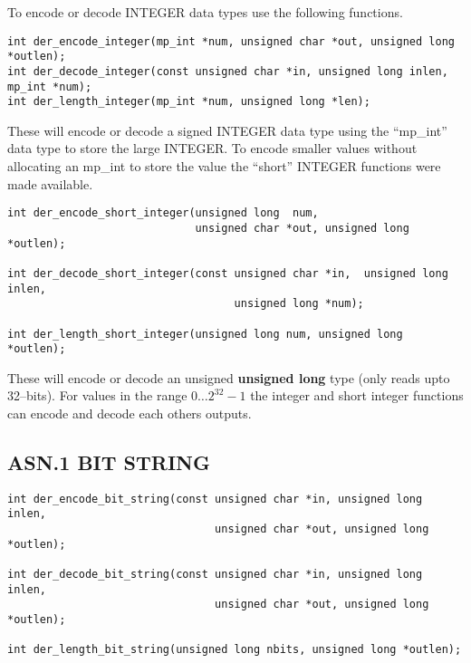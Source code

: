 \documentclass[a4paper]{book}
\begin{document}
To encode or decode INTEGER data types use the following functions.

\begin{verbatim}
int der_encode_integer(mp_int *num, unsigned char *out, unsigned long *outlen);
int der_decode_integer(const unsigned char *in, unsigned long inlen, mp_int *num);
int der_length_integer(mp_int *num, unsigned long *len);
\end{verbatim}

These will encode or decode a signed INTEGER data type using the ``mp\_int'' data type to store the large INTEGER.  To encode smaller values without allocating
an mp\_int to store the value the ``short'' INTEGER functions were made available.

\begin{verbatim}
int der_encode_short_integer(unsigned long  num, 
                             unsigned char *out, unsigned long *outlen);

int der_decode_short_integer(const unsigned char *in,  unsigned long inlen, 
                                   unsigned long *num);

int der_length_short_integer(unsigned long num, unsigned long *outlen);
\end{verbatim}

These will encode or decode an unsigned \textbf{unsigned long} type (only reads upto 32--bits).  For values in the range $0 \dots 2^{32} - 1$ the integer 
and short integer functions can encode and decode each others outputs.  

\subsection{ASN.1 BIT STRING}

\begin{verbatim}
int der_encode_bit_string(const unsigned char *in, unsigned long inlen,
                                unsigned char *out, unsigned long *outlen);

int der_decode_bit_string(const unsigned char *in, unsigned long inlen,
                                unsigned char *out, unsigned long *outlen);

int der_length_bit_string(unsigned long nbits, unsigned long *outlen);
\end{verbatim}
\end{document}
